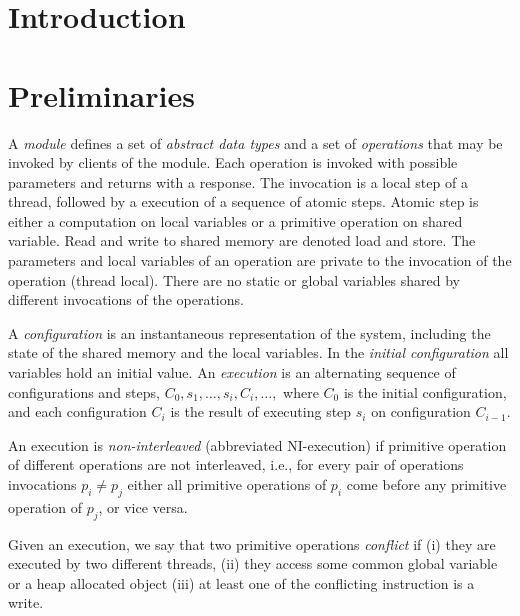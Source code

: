 \documentclass{article}
\newcommand{\code}[1]{\textsf{#1}}
\begin{document}
\maketitle

\section{Introduction}

\section{Preliminaries}
A \emph{module} defines a set of \emph{abstract data types} and a 
set of \emph{operations} that may be invoked by
clients of the module.
Each operation is invoked with possible parameters
and returns with a response. 
The invocation is a local step of a thread, 
followed by a execution of a sequence of atomic steps. 
Atomic step is either a computation on local 
variables or a primitive operation on shared variable.
Read and write to shared memory are 
denoted load and store.  
The parameters and local variables 
of an operation are private to the
invocation of the operation (thread local). 
There are no static or global variables shared by  
different invocations of the operations. 

A \emph{configuration} is an instantaneous representation 
of the system, including the state of the shared memory
and the local variables. In the \emph{initial configuration} 
all variables hold an initial value. 
An \emph{execution} is an alternating sequence of 
configurations and steps,
$C_0,s_1,\ldots,s_i,C_i,\ldots,$ 
where $C_0$ is the initial configuration,
and each configuration $C_i$ is the result of
executing step $s_i$ on configuration $C_{i-1}$.
 
An execution is \emph{non-interleaved} 
(abbreviated NI-execution) if primitive operation of 
different operations are not interleaved, i.e., 
for every pair of operations invocations $p_i \neq p_j$ 
either all primitive operations of $p_i$ come before any 
primitive operation of $p_j$, or vice versa.
 
Given an execution, we say that two primitive operations 
\emph{conflict} if (i) they are executed by two different threads, 
(ii) they access some common global variable or a heap allocated object 
(iii) at least one of the conflicting instruction is a write.
\end{document}
